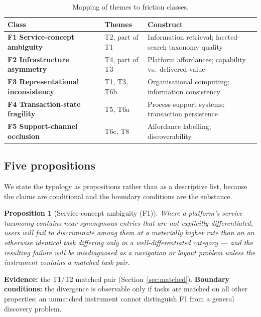 \documentclass[]{interact}
\theoremstyle{plain}
\newtheorem{proposition}[section]{Proposition}
\begin{document}
\begin{table}[htbp]
\caption{Mapping of themes to friction classes.}
\label{tab:classmap}
\begin{tabular}{@{}p{} p{} p{}@{}}
\toprule
\textbf{Class} & \textbf{Themes} & \textbf{Construct} \\
\midrule
\textbf{F1 Service-concept ambiguity} & T2, part of T1 & Information retrieval; faceted-search taxonomy quality \\
\textbf{F2 Infrastructure asymmetry} & T4, part of T3 & Platform affordances; capability vs.\ delivered value \\
\textbf{F3 Representational inconsistency} & T1, T3, T6b & Organisational computing; information consistency \citep{braniwati2026price} \\
\textbf{F4 Transaction-state fragility} & T5, T6a & Process-support systems; transaction persistence \\
\textbf{F5 Support-channel occlusion} & T6c, T8 & Affordance labelling; discoverability \\
\bottomrule
\end{tabular}
\end{table}

\subsection{Five propositions}

We state the typology as propositions rather than as a descriptive list, because the claims are
conditional and the boundary conditions are the substance.

\begin{proposition}[Service-concept ambiguity (F1)]
\label{prop:F1}
\emph{Where a platform's service taxonomy contains near-synonymous entries that are not explicitly
differentiated, users will fail to discriminate among them at a materially higher rate than on an
otherwise identical task differing only in a well-differentiated category --- and the resulting failure
will be misdiagnosed as a navigation or layout problem unless the instrument contains a matched task
pair.}
\end{proposition}

\noindent\textbf{Evidence:} the T1/T2 matched pair (Section~\ref{sec:matched}). \textbf{Boundary
conditions:} the divergence is observable only if tasks are matched on all other properties; an
unmatched instrument cannot distinguish F1 from a general discovery problem.
\end{document}
